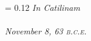 \documentclass[a4paper, 10pt]{article}
\begin{document}
\begin{titlepage}
  \pagestyle{empty}
  \begingroup
  \centering
  \drop = 0.12\textheight
  \vspace*{\drop}
  {\Huge \itshape In Catilinam}\\[\drop]
  {\HUGE \scshape {}}\\[\drop]
  {\Large \itshape November 8, 63 \textsc{b.c.e.}}\\[0.3\drop]
  \endgroup
  \tableofcontents
\end{titlepage}





\end{document}

